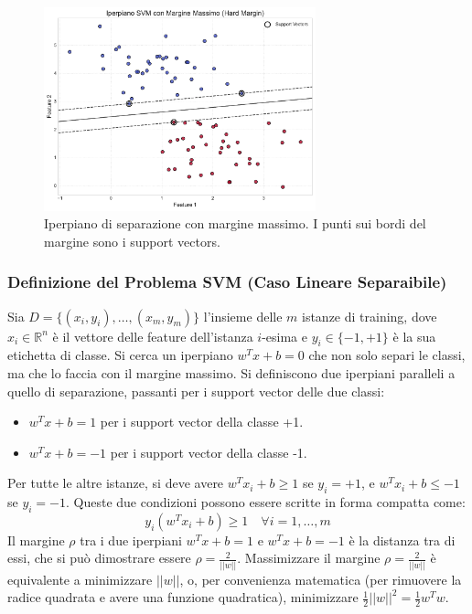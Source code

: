 \documentclass{article}
\begin{document}
\begin{figure}[H]
    \centering
    \includegraphics[width=0.7\textwidth]{images/max_margin_hyperplane.pdf}
    \caption{Iperpiano di separazione con margine massimo. I punti sui bordi del margine sono i support vectors.}
    \label{fig:max_margin_hyperplane}
\end{figure}

\subsubsection{Definizione del Problema SVM (Caso Lineare Separaibile)}
Sia $D = \{(x_i, y_i), \dots, (x_m, y_m)\}$ l'insieme delle $m$ istanze di training, dove $x_i \in \mathbb{R}^n$ è il vettore delle feature dell'istanza $i$-esima e $y_i \in \{-1, +1\}$ è la sua etichetta di classe.
Si cerca un iperpiano $w^T x + b = 0$ che non solo separi le classi, ma che lo faccia con il margine massimo.
Si definiscono due iperpiani paralleli a quello di separazione, passanti per i support vector delle due classi:
\begin{itemize}
    \item $w^T x + b = 1$ per i support vector della classe +1.
    \item $w^T x + b = -1$ per i support vector della classe -1.
\end{itemize}
Per tutte le altre istanze, si deve avere $w^T x_i + b \ge 1$ se $y_i = +1$, e $w^T x_i + b \le -1$ se $y_i = -1$. Queste due condizioni possono essere scritte in forma compatta come:
$$ y_i (w^T x_i + b) \ge 1 \quad \forall i=1, \dots, m $$
Il margine $\rho$ tra i due iperpiani $w^T x + b = 1$ e $w^T x + b = -1$ è la distanza tra di essi, che si può dimostrare essere $\rho = \frac{2}{||w||}$.
Massimizzare il margine $\rho = \frac{2}{||w||}$ è equivalente a minimizzare $||w||$, o, per convenienza matematica (per rimuovere la radice quadrata e avere una funzione quadratica), minimizzare $\frac{1}{2} ||w||^2 = \frac{1}{2} w^T w$.
\end{document}
